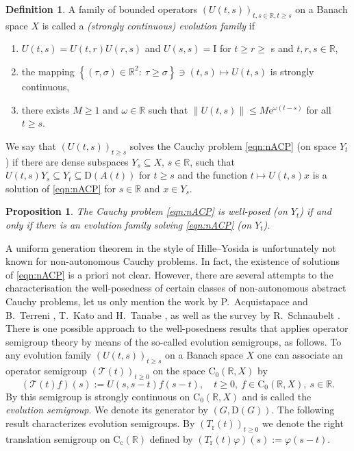 \documentclass[a4paper,oneside,10pt]{amsart}
\newtheorem{proposition}[theorem]{Proposition}
\theoremstyle{definition}
\newtheorem{definition}[theorem]{Definition}
\numberwithin{equation}{section}
\newenvironment{iiv}{\begin{enumerate}[{\rm (i)}]}{\end{enumerate}}
\def\ee{\mathrm{e}}
\def\dom{\mathrm{D}}
\def\RR{\mathbb{R}}
\def\Id{\mathrm{I}}
\begin{document}
\begin{definition}{\cite[Def. VI.9.2]{EN}}
A family of bounded operators $(U(t,s))_{t,s\in\RR, t\geq s}$ on a Banach space $X$ is called a \emph{(strongly continuous) evolution family} if
\begin{iiv}
	\item $U(t,s)=U(t,r)U(r,s)$ and $U(s,s)=\Id$ for $t\geq r\geq$ s and $t,r,s\in\RR$,
	\item the mapping $\left\{(\tau,\sigma)\in\RR^2:\ \tau\geq\sigma\right\}\ni(t,s)\mapsto U(t,s)$ is strongly continuous,
	\item there exists $M\geq1$ and $\omega\in\RR$ such that $\left\|U(t,s)\right\|\leq M\ee^{\omega(t-s)}$ for all $t\geq s$.
\end{iiv}
We say that $(U(t,s))_{t\geq s}$ solves the Cauchy problem \eqref{eqn:nACP} (on space $Y_t$) if there are dense subspaces $Y_s\subseteq X$, $s\in\RR$,  such that $U(t,s)Y_s\subseteq Y_t\subseteq\dom(A(t))$ for $t\geq s$ and the function $t\mapsto U(t,s)x$ is a solution of \eqref{eqn:nACP} for $s\in\RR$ and $x\in Y_s$.
\end{definition} 

\begin{proposition}{\cite[Prop.~2.5]{N1997}}
The Cauchy problem \eqref{eqn:nACP} is well-posed (on $Y_t$) if and only if there is an evolution family solving \eqref{eqn:nACP} (on $Y_t$).
\end{proposition}


A uniform generation theorem in the style of Hille--Yosida is unfortunately not known for non-autonomous Cauchy problems. In fact, the existence of solutions of \eqref{eqn:nACP} is a priori not clear. However, there are several attempts to the characterisation the  well-posedness of certain classes of non-autonomous abstract Cauchy problems, let us only mention the work by P.~Acquistapace and B.~Terreni \cite{AT1987}, T.~Kato and H.~Tanabe \cite{KT1962}, as well as the survey by R.~Schnaubelt \cite{S2002}. There is one possible approach to the  well-posedness results that applies operator semigroup theory  by means of the so-called evolution semigroups, as follows. To any evolution family $(U(t,s))_{t\geq s}$ on a Banach space $X$ one can associate an operator semigroup $(\mathcal{T}(t))_{t\geq0}$ on the space $\mathrm{C}_0(\RR,X)$ by
\[
(\mathcal{T}(t)f)(s):= U(s,s-t)f(s-t),\quad t\geq0,\ f\in\mathrm{C}_0(\RR,X),\ s\in\RR.
\]
By \cite[Lemma~VI.9.10]{EN} this semigroup is strongly continuous on $\mathrm{C}_0(\RR,X)$ and is called the \emph{evolution semigroup}. We denote its generator by $(G,\dom(G))$. The following result characterizes evolution semigroups. By $(T_\mathrm{r}(t))_{t\ge 0}$ we denote the right translation semigroup on $\mathrm{C}_{\mathrm{c}}(\RR)$ defined by $(T_\mathrm{r}(t)\varphi )(s):= \varphi(s-t)$.
\end{document}

